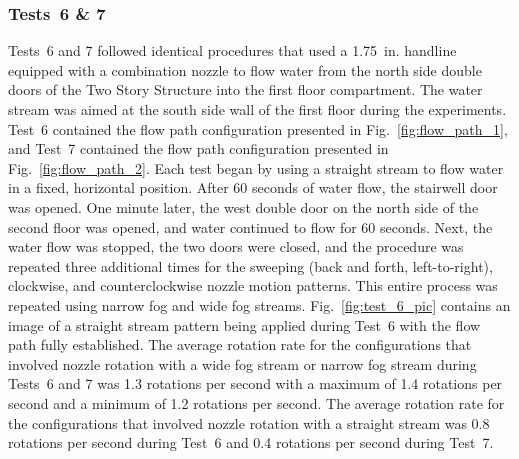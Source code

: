 \documentclass[12pt,oneside]{book}
\begin{document}
\subsubsection{Tests~6 \& 7}
Tests~6 and 7 followed identical procedures that used a 1.75~in. handline equipped with a combination nozzle to flow water from the north side double doors of the Two Story Structure into the first floor compartment. The water stream was aimed at the south side wall of the first floor during the experiments. Test~6 contained the flow path configuration presented in Fig.~\ref{fig:flow_path_1}, and Test~7 contained the flow path configuration presented in Fig.~\ref{fig:flow_path_2}. Each test began by using a straight stream to flow water in a fixed, horizontal position. After 60 seconds of water flow, the stairwell door was opened. One minute later, the west double door on the north side of the second floor was opened, and water continued to flow for 60 seconds. Next, the water flow was stopped, the two doors were closed, and the procedure was repeated three additional times for the sweeping (back and forth, left-to-right), clockwise, and counterclockwise nozzle motion patterns. This entire process was repeated using narrow fog and wide fog streams. Fig.~\ref{fig:test_6_pic} contains an image of a straight stream pattern being applied during Test~6 with the flow path fully established. The average rotation rate for the configurations that involved nozzle rotation with a wide fog stream or narrow fog stream during Tests~6 and 7 was 1.3 rotations per second with a maximum of 1.4 rotations per second and a minimum of 1.2 rotations per second. The average rotation rate for the configurations that involved nozzle rotation with a straight stream was 0.8 rotations per second during Test~6 and 0.4 rotations per second during Test~7.
\end{document}
